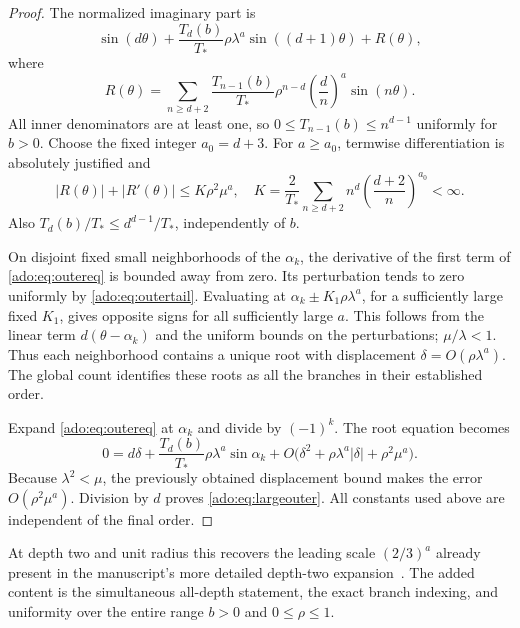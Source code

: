 \begin{proof}
The normalized imaginary part is
\begin{equation}\label{ado:eq:outereq}
 \sin(d\theta)+\frac{T_d(b)}{T_*}\rho\lambda^a
                   \sin((d+1)\theta)+R(\theta),
\end{equation}
where
\[
 R(\theta)=\sum_{n\ge d+2}\frac{T_{n-1}(b)}{T_*}
        \rho^{n-d}\left(\frac dn\right)^a\sin(n\theta).
\]
All inner denominators are at least one, so
$0\le T_{n-1}(b)\le n^{d-1}$ uniformly for $b>0$. Choose the fixed
integer $a_0=d+3$. For $a\ge a_0$, termwise differentiation is
absolutely justified and
\begin{equation}\label{ado:eq:outertail}
 |R(\theta)|+|R'(\theta)|\le K\rho^2\mu^a,
 \quad
 K=\frac2{T_*}\sum_{n\ge d+2}n^d
                        \left(\frac{d+2}{n}\right)^{a_0}<\infty.
\end{equation}
Also $T_d(b)/T_*\le d^{d-1}/T_*$, independently of $b$.

On disjoint fixed small neighborhoods of the $\alpha_k$, the derivative
of the first term of \eqref{ado:eq:outereq} is bounded away from zero.
Its perturbation tends to zero uniformly by \eqref{ado:eq:outertail}.
Evaluating at $\alpha_k\pm K_1\rho\lambda^a$, for a sufficiently
large fixed $K_1$, gives opposite signs for all sufficiently large $a$.
This follows from the linear term $d(\theta-\alpha_k)$ and the
uniform bounds on the perturbations; $\mu/\lambda<1$. Thus each
neighborhood contains a unique root with displacement
$\delta=O(\rho\lambda^a)$. The global count identifies these roots
as all the branches in their established order.

Expand \eqref{ado:eq:outereq} at $\alpha_k$ and divide by $(-1)^k$.
The root equation becomes
\[
 0=d\delta+\frac{T_d(b)}{T_*}\rho\lambda^a\sin\alpha_k
     +O\bigl(\delta^2+\rho\lambda^a|\delta|
                         +\rho^2\mu^a\bigr).
\]
Because $\lambda^2<\mu$, the previously obtained displacement bound
makes the error $O(\rho^2\mu^a)$. Division by $d$ proves
\eqref{ado:eq:largeouter}. All constants used above are independent
of the final order.
\end{proof}
At depth two and unit radius this recovers the leading scale
$(2/3)^a$ already present in the manuscript's more detailed depth-two
expansion~\cite{repoSigned}. The added content is the simultaneous
all-depth statement, the exact branch indexing, and uniformity over the
entire range $b>0$ and $0\le\rho\le1$.
